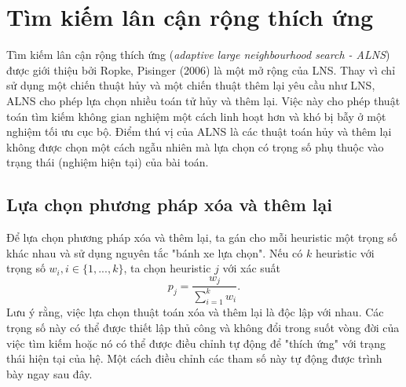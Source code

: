 \section{Tìm kiếm lân cận rộng thích ứng}
Tìm kiếm lân cận rộng thích ứng (\textit{adaptive large neighbourhood search - ALNS}) được giới thiệu bởi Ropke, Pisinger (2006) \cite{ropke2006adaptive} là một mở rộng của LNS. Thay vì chỉ sử dụng một chiến thuật hủy và một chiến thuật thêm lại yêu cầu như LNS, ALNS cho phép lựa chọn nhiều toán tử hủy và thêm lại. Việc này cho phép thuật toán tìm kiếm không gian nghiệm một cách linh hoạt hơn và khó bị bẫy ở một nghiệm tối ưu cục bộ. Điểm thú vị của ALNS là các thuật toán hủy và thêm lại không được chọn một cách ngẫu nhiên mà lựa chọn có trọng số phụ thuộc vào trạng thái (nghiệm hiện tại) của bài toán.

\subsection{Lựa chọn phương pháp xóa và thêm lại}
Để lựa chọn phương pháp xóa và thêm lại, ta gán cho mỗi heuristic một trọng số khác nhau và sử dụng nguyên tắc "bánh xe lựa chọn". Nếu có $k$ heuristic với trọng số $w_i, i \in \{1,...,k\}$, ta chọn heuristic $j$ với xác suất
\begin{equation}
	\label{eq:select}
	p_j = \frac{w_j}{\sum_{i=1}^k w_i}.
\end{equation}
Lưu ý rằng, việc lựa chọn thuật toán xóa và thêm lại là độc lập với nhau. Các trọng số này có thể được thiết lập thủ công và không đổi trong suốt vòng đời của việc tìm kiếm hoặc nó có thể được điều chỉnh tự động để "thích ứng" với trạng thái hiện tại của hệ. Một cách điều chỉnh các tham số này tự động được trình bày ngay sau đây.

